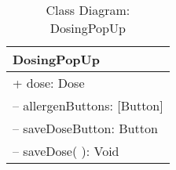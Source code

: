 \begin{table}[ht]
\centering
\caption{Class Diagram: DosingPopUp}

\hspace{1em}
\renewcommand{\arraystretch}{1.7}

\begin{tabular}{|l|}
\hline
\textbf{DosingPopUp} \\
\hline
+ dose: Dose \\
– allergenButtons: [Button] \\
– saveDoseButton: Button \\
\hdashline
– saveDose( ): Void \\
\hline
\end{tabular}
\end{table}

